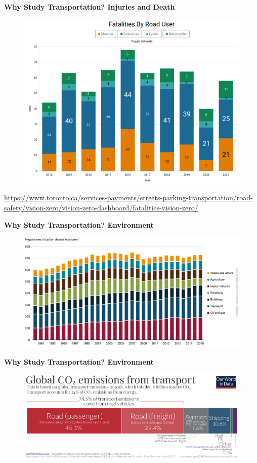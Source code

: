 \documentclass[aspectratio=169]{beamer}
\begin{document}
\begin{frame}
	\textbf{Why Study Transportation? Injuries and Death}
	\begin{figure}
		\centering
		\includegraphics[width=0.7\linewidth]{images/vision_zero_deaths.png}
	\end{figure}
	\tiny\url{https://www.toronto.ca/services-payments/streets-parking-transportation/road-safety/vision-zero/vision-zero-dashboard/fatalities-vision-zero/}
\end{frame}




\begin{frame}
	\textbf{Why Study Transportation? Environment}
	\begin{figure}
		\centering
		\includegraphics[width=0.8\linewidth]{images/canada_emissions_by_sector.png}
	\end{figure}
\end{frame}


\begin{frame}
	\textbf{Why Study Transportation? Environment}
	\begin{figure}
		\centering
		\includegraphics[width=0.8\linewidth]{images/Transport-CO2-emissions-by-mode-bar-chart.png}
	\end{figure}
\end{frame}
\end{document}
